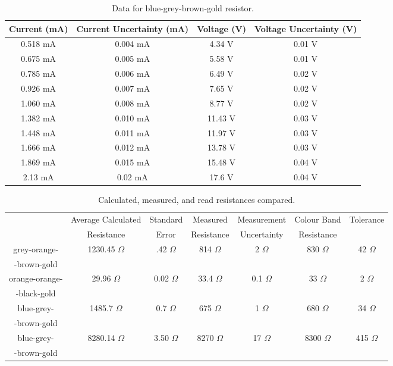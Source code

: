 \documentclass[11pt]{article}
\begin{document}
\begin{table}[htb]
    \caption{\label{tab:tab4}Data for blue-grey-brown-gold resistor.}
    \vspace{1em}\hline\hline\vspace{0.3em}\centering
    \begin{tabular}{cccc}
        Current (mA)&Current Uncertainty (mA)&Voltage (V)&Voltage Uncertainty (V)\\
        \hline

0.518 mA&0.004 mA&4.34 V&0.01 V\\
0.675 mA&0.005 mA&5.58 V&0.01 V\\
0.785 mA&0.006 mA&6.49 V&0.02 V\\
0.926 mA&0.007 mA&7.65 V&0.02 V\\
1.060 mA&0.008 mA&8.77 V&0.02 V\\
1.382 mA&0.010 mA&11.43 V&0.03 V\\
1.448 mA&0.011 mA&11.97 V&0.03 V\\
1.666 mA&0.012 mA&13.78 V&0.03 V\\
1.869 mA&0.015 mA&15.48 V&0.04 V\\
2.13 mA&0.02 mA&17.6 V&0.04 V\\

    \end{tabular}
    \hline\hline
\end{table}


\begin{table}[htb]
    \caption{\label{tab:tab5}Calculated, measured, and read resistances compared.}
    \vspace{1em}\hline\hline\vspace{0.3em}\centering
    \begin{tabular}{ccccccc}
        &Average Calculated&Standard&Measured&Measurement&Colour Band&Tolerance\\
        &Resistance&Error&Resistance&Uncertainty&Resistance&\\
        \hline
        grey-orange-&1230.45 $\Omega$&.42 $\Omega$&814 $\Omega$&2 $\Omega$&830 $\Omega$&42 $\Omega$ \\
        -brown-gold&&&&&& \\
        orange-orange-&29.96 $\Omega$&0.02 $\Omega$&33.4 $\Omega$&0.1 $\Omega$&33 $\Omega$&2 $\Omega$ \\
        -black-gold&&&&&& \\
        blue-grey-&1485.7 $\Omega$&0.7 $\Omega$&675 $\Omega$& 1 $\Omega$&680 $\Omega$&34 $\Omega$ \\
        -brown-gold&&&&&& \\
        blue-grey-&8280.14 $\Omega$&3.50 $\Omega$&8270 $\Omega$&17 $\Omega$&8300 $\Omega$&415 $\Omega$ \\
        -brown-gold&&&&&& \\
    \end{tabular}
    \hline\hline
\end{table}
\end{document}
